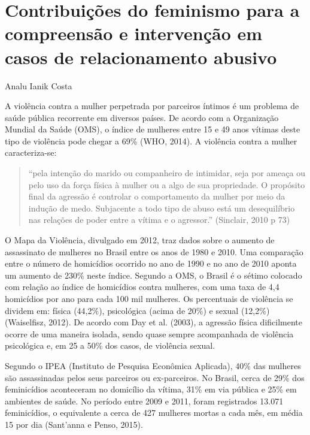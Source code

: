 \chapter{Contribuições do feminismo para a compreensão e intervenção em casos de relacionamento abusivo}
\begin{flushright}
\begin{scriptsize}
    Analu Ianik Costa
\end{scriptsize}
\vspace{1cm}
\end{flushright}

A violência contra a mulher perpetrada por parceiros íntimos é um problema de saúde pública recorrente em diversos países. De acordo com a Organização Mundial da Saúde (OMS), o índice de mulheres entre 15 e 49 anos vítimas deste tipo de violência pode chegar a 69\% (WHO, 2014). A violência contra a mulher caracteriza-se:

\begin{quote}
    ``pela intenção do marido ou companheiro de intimidar, seja por ameaça ou pelo uso da força física à mulher ou a algo de sua propriedade. O propósito final da agressão é controlar o comportamento da mulher por meio da indução de medo. Subjacente a todo tipo de abuso está um desequilíbrio nas relações de poder entre a vítima e o agressor.'' (Sinclair, 2010 p 73)
\end{quote}

O Mapa da Violência, divulgado em 2012, traz dados sobre o aumento de assassinato de mulheres no Brasil entre os anos de 1980 e 2010. Uma comparação entre o número de homicídios ocorrido no ano de 1990 e no ano de 2010 aponta um aumento de 230\% neste índice. Segundo a OMS, o Brasil é o sétimo colocado com relação ao índice de homicídios contra mulheres, com uma taxa de 4,4 homicídios por ano para cada 100 mil mulheres. Os percentuais de violência se dividem em: física (44,2\%), psicológica (acima de 20\%) e sexual (12,2\%) (Waiselfisz, 2012). De acordo com Day et al. (2003), a agressão física dificilmente ocorre de uma maneira isolada, sendo quase sempre acompanhada de violência psicológica e, em 25 a 50\% dos casos, de violência sexual.

Segundo o IPEA (Instituto de Pesquisa Econômica Aplicada), 40\% das mulheres são assassinadas pelos seus parceiros ou ex-parceiros. No Brasil, cerca de 29\% dos feminicídios aconteceram no domicílio da vítima, 31\% em via pública e 25\% em ambientes de saúde. No período entre 2009 e 2011, foram registrados 13.071 feminicídios, o equivalente a cerca de 427 mulheres mortas a cada mês, em média 15 por dia (Sant’anna e Penso, 2015).

